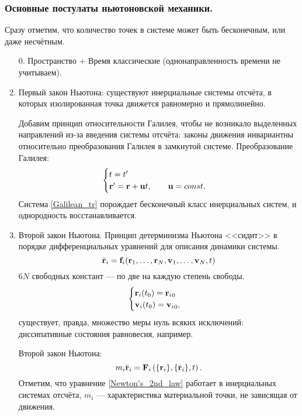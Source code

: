\documentclass[12pt, a4paper]{article}
\begin{document}
\subsubsection{Основные постулаты ньютоновской механики.}
Сразу отметим, что количество точек в системе может быть бесконечным, или даже несчётным.

\begin{enumerate}
\item[0.] Пространство $+$ Время классические (однонаправленность времени не учитываем).
\item Первый закон Ньютона:  существуют инерциальные системы отсчёта, в которых изолированная точка движется равномерно и прямолинейно.

Добавим принцип относительности Галилея, чтобы не возникало выделенных направлений из-за введения системы отсчёта: законы движения инвариантны относительно преобразования Галилея в замкнутой системе. Преобразование Галилея:
\begin{equation}
\begin{cases}
t = t'\\
\vb{r'} = \vb{r} + \vb{u}t, \qquad \vb{u} = const.
\end{cases}
\label{Galilean_tr}
\end{equation}
Система \eqref{Galilean_tr} порождает бесконечный класс инерциальных систем, и однородность восстанавливается.

\item Второй закон Ньютона.  Принцип детерминизма Ньютона <<сидит>> в порядке дифференциальных уравнений для описания динамики системы.
\begin{equation*}
\Ddot{\vb{r}}_i = \vb{f}_i (\vb{r}_1, \dots, \vb{r}_N, \vb{v}_1, \dots, \vb{v}_N, t) 
\end{equation*}
$6N$ свободных констант --- по две на каждую степень свободы.
\begin{equation*}
\begin{cases}
\vb{r}_i (t_0) = {\vb{r}_i}_0\\
\vb{v}_i (t_0) = {\vb{v}_i}_0,
\end{cases}
\end{equation*}
существует, правда, множество меры нуль всяких исключений: диссипативные состояния равновесия, например.

Второй закон Ньютона:
\begin{equation}
m_i \ddot{\vb{r}}_i = \vb{F}_i \left(\{\vb{r}_i\}, \{\dot{\vb{r}}_i\}, t\right).
\label{Newton's_2nd_law}
\end{equation}
Отметим, что уравнение \eqref{Newton's_2nd_law} работает в инерциальных системах отсчёта, $m_i$ --- характеристика материальной точки, не зависящая от движения.


\end{enumerate}
\end{document}

